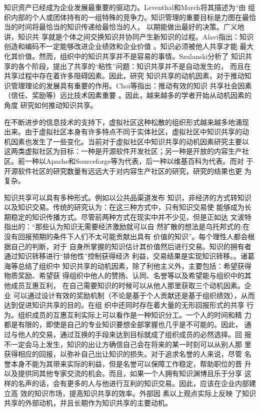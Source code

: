 \documentclass[12pt,a4paper,cs4size]{ctexart}
\begin{document}
知识资产已经成为企业发展最重要的驱动力。Leventhal和March将其描述为“由
组织内部的个人或团体持有的一组特殊的竞争力\cite{levinthal1993ml}。知识管理的重要目标是力图在最恰当的时间将最恰当的知识传递给最恰当的人，
以期能做出最好的决策\cite{Petrash1996}。广义地讲，知识共
享就是个体之间交换知识并协同产生新知识的过程。Alavi指出：知识创造和编码不一定能够改进企业绩效和企业价值
\cite{alavi2000mok}。知识必须被他人共享才能
最大化其价值。然而，组织中的知识共享并不是容易的事情。Szulanski分析了
知识共享的各个阶段，提出了共享的“粘性”问题：知识共享并不是自动发生的，
而且在共享过程中存在着许多阻碍因素\cite{szulanski2000pkt}。因此，研究
知识共享的动机因素，对于推动知识管理理论的发展具有重要的作用。Choi等指出：推动有效的知识
共享社会因素（信任、奖励等）远比技术因素重要
\cite{SueYoungChoi10012008}。因此，越来越多的学者开始从动机因素的角度
研究如何推动知识共享。

在不断进步的信息技术的支持下，虚拟社区这种松散的组织形式越来越多地涌现
出来。由于虚拟社区本身有许多特点不同于实体社区，虚拟社区中知识共享的动
机因素也发生了一些变化。当前对于虚拟社区中知识共享的动机因素研究主要以
这两类虚拟社区为目标：一种是开源软件开发社区；另一种是开放的内容生产社
区。前一种以Apache和Sourceforge等为代表，后一种以维基百科为代表。而对
于开源软件社区的研究数量有远远大于对内容生产社区的研究，研究的结果也更
为复杂。

知识共享可以具有多种形式。例如以公共品渠道发布
知识，非经济的方式转知识以及知识交易。传统的研究认为：在这三种方式中，只有知识交易使
能够成为长期稳定的知识传播方式。尽管前两种方式在现实中并不少见，但是正如达
文波特指出的：“那些认为知识无需要经济激励就可以自
然扩散的想法是乌托邦式的;在没有回报预期的条件下人们不太可能贡献出具有
价值的知识”\cite{davenport1998wko}。每个理性人都会根据自己的判断，对于
自身所掌握的知识估计其价值然后进行交易。知识的拥有者通过知识转移进行“排他性”控制获得经济
利益，交易结果是实现知识转移。\cite{zhoubo2006}。诸葛海等总结了组织中
知识共享的动机因素，除了利他主义外，主要包括：希望获得物质奖励、希望获
得组织中他人的赞扬、认同、名誉等以及希望能与组织中的其他成员互惠互利，
在自己需要知识的时候可以从他人那里获取三个动机因素\cite{Zhugea}。企业
可以通过设计有效的奖励机制（不论是基于个人贡献还是基于组织绩效），从而
达到促进知识共享的目的\cite{Lee2007}。在组
织中还同时存在着大量的无形回报形式的共享
行为。组织成员的互惠互利实际上可以看作是一种知识分工。一个人的时间和精
力都是有限的，即使是自己的专业知识要想全部掌握也几乎是不可能的。因此，
通过与他人的交易，通过互换的手段来达到目标就成了组织成员的必然选择。回
报不一定会马上发生，知识的出让方确信自己会在将来的某一时刻可以从别人那
里获得相应的回报，以弥补自己出让知识的损失。对于追求名誉的人来说，尽管
名誉本身不能为其带来实际的利益，但是名誉可以保障工作稳定，帮助职位的晋
升以及提供同其他专家交流的机会。而且，如果一个人拥有知识渊博且乐于分享
这样的名声的话，会有更多的人与他进行互利的知识交易。因此，应该在企业内部建立高
效的知识市场，提高知识共享的效率\cite{Andreas2007}。外部因
素以上观点实际上反映
了知识共享的外部动机，并且长期作为知识共享的主要动机。
\end{document}
